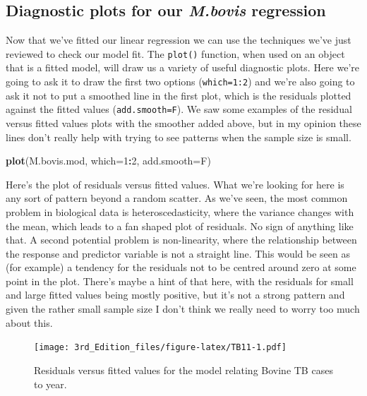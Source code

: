 \documentclass[
]{book}
\newenvironment{Shaded}{\begin{snugshade}}{\end{snugshade}}
\newcommand{\DataTypeTok}[1]{\textcolor[rgb]{0.13,0.29,0.53}{#1}}
\newcommand{\DecValTok}[1]{\textcolor[rgb]{0.00,0.00,0.81}{#1}}
\newcommand{\KeywordTok}[1]{\textcolor[rgb]{0.13,0.29,0.53}{\textbf{#1}}}
\newcommand{\NormalTok}[1]{#1}
\newcommand{\OperatorTok}[1]{\textcolor[rgb]{0.81,0.36,0.00}{\textbf{#1}}}
\begin{document}
\hypertarget{diagnostic-plots-for-our-m.bovis-regression}{%
\subsection{\texorpdfstring{Diagnostic plots for our \emph{M.bovis} regression}{Diagnostic plots for our M.bovis regression}}\label{diagnostic-plots-for-our-m.bovis-regression}}

Now that we've fitted our linear regression we can use the techniques we've just reviewed to check our model fit. The \texttt{plot()} function, when used on an object that is a fitted model, will draw us a variety of useful diagnostic plots. Here we're going to ask it to draw the first two options (\texttt{which=1:2}) and we're also going to ask it not to put a smoothed line in the first plot, which is the residuals plotted against the fitted values (\texttt{add.smooth=F}). We saw some examples of the residual versus fitted values plots with the smoother added above, but in my opinion these lines don't really help with trying to see patterns when the sample size is small.

\begin{Shaded}
\begin{Highlighting}[]
\KeywordTok{plot}\NormalTok{(M.bovis.mod, }\DataTypeTok{which=}\DecValTok{1}\OperatorTok{:}\DecValTok{2}\NormalTok{, }\DataTypeTok{add.smooth=}\NormalTok{F)}
\end{Highlighting}
\end{Shaded}

Here's the plot of residuals versus fitted values. What we're looking for here is any sort of pattern beyond a random scatter. As we've seen, the most common problem in biological data is heteroscedasticity, where the variance changes with the mean, which leads to a fan shaped plot of residuals. No sign of anything like that. A second potential problem is non-linearity, where the relationship between the response and predictor variable is not a straight line. This would be seen as (for example) a tendency for the residuals not to be centred around zero at some point in the plot. There's maybe a hint of that here, with the residuals for small and large fitted values being mostly positive, but it's not a strong pattern and given the rather small sample size I don't think we really need to worry too much about this.

\begin{figure}
\centering
\texttt{[image: 3rd\_Edition\_files/figure-latex/TB11-1.pdf]}
\caption{\label{fig:TB11}Residuals versus fitted values for the model relating Bovine TB cases to year.}
\end{figure}
\end{document}
